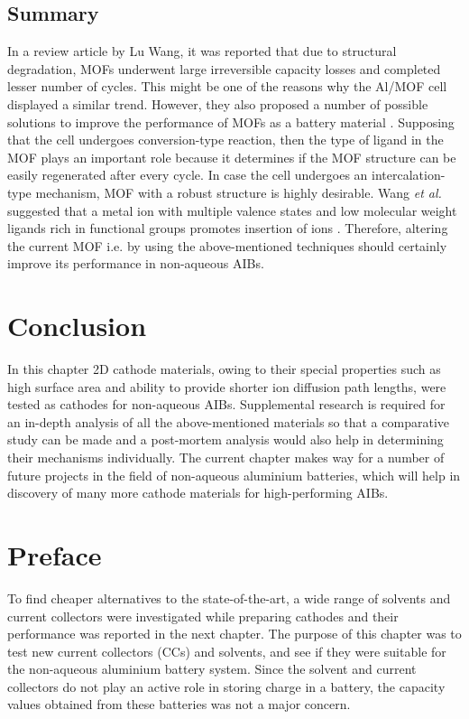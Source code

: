 \subsection{Summary}
In a review article by Lu Wang, it was reported that due to structural degradation, MOFs underwent large irreversible capacity losses and completed lesser number of cycles. This might be one of the reasons why the Al/MOF cell displayed a similar trend. However, they also proposed a number of possible solutions to improve the performance of MOFs as a battery material \cite{wang_metalorganic_2016}. Supposing that the cell undergoes conversion-type reaction, then the type of ligand in the MOF plays an important role because it determines if the MOF structure can be easily regenerated after every cycle. In case the cell undergoes an intercalation-type mechanism, MOF with a robust structure is highly desirable. Wang \textit{et al.} suggested that a metal ion with multiple valence states and low molecular weight ligands rich in functional groups promotes insertion of  ions \cite{wang_metalorganic_2016}. Therefore, altering the current MOF i.e.  by using the above-mentioned techniques should certainly improve its performance in non-aqueous AIBs. 

\section{Conclusion}
In this chapter 2D cathode materials, owing to their special properties such as high surface area and ability to provide shorter ion diffusion path lengths, were tested as cathodes for non-aqueous AIBs.  
Supplemental research is required for an in-depth analysis of all the above-mentioned materials so that a comparative study can be made and a post-mortem analysis would also help in determining their mechanisms individually. The current chapter makes way for a number of future projects in the field of non-aqueous aluminium batteries, which will help in discovery of many more cathode materials for high-performing AIBs.  
\newpage
\section*{Preface}
To find cheaper alternatives to the state-of-the-art, a wide range of solvents and current collectors were investigated while preparing cathodes and their performance was reported in the next chapter. The purpose of this chapter was to test new current collectors (CCs) and solvents, and see if they were suitable for the non-aqueous aluminium battery system. Since the solvent and current collectors do not play an active role in storing charge in a battery, the capacity values obtained from these batteries was not a major concern.  
